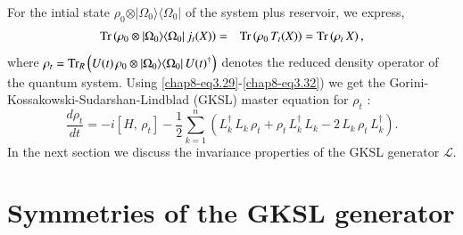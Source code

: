 For the intial state $\rho_0\otimes \vert \Omega_0\rangle\langle\Omega_0\vert$ of the system plus reservoir, we express,
\begin{eqnarray}
{\rm Tr}\left(\rho_0\otimes \vert \Omega_0\rangle\langle\Omega_0\vert\, j_t(X)\right)&=& {\rm Tr}\left(\rho_0\, T_t(X)\right)={\rm Tr}\left(\rho_t\, X\right), \label{chap8-eq3.32}
\end{eqnarray} 
where $\rho_t={\rm Tr}_R\left( U(t)\, \rho_0\otimes \vert \Omega_0\rangle\langle\Omega_0\vert\, U(t)^\dag\right)$ denotes the reduced density operator of the quantum system. Using \eqref{chap8-eq3.29}-\eqref{chap8-eq3.32}) we get the Gorini-Kossakowski-Sudarshan-Lindblad (GKSL) master equation for $\rho_t$ :
\begin{equation}
\frac{d \rho_t}{dt} = -i [ H,\,\rho_t]- \frac{1}{2} \sum_{k=1}^{n}\left(L^\dag_k\, L_k\, \rho_t + \rho_t\, L^\dag_k\, L_k -2\, L_k\, \rho_t\, L^\dag_k\right).  \label{chap8-eq3.33}
\end{equation}  
In the next section we discuss the invariance properties of the GKSL generator $\mathcal{L}$.   

\section{Symmetries of the GKSL generator} \label{chap8-sec4}

